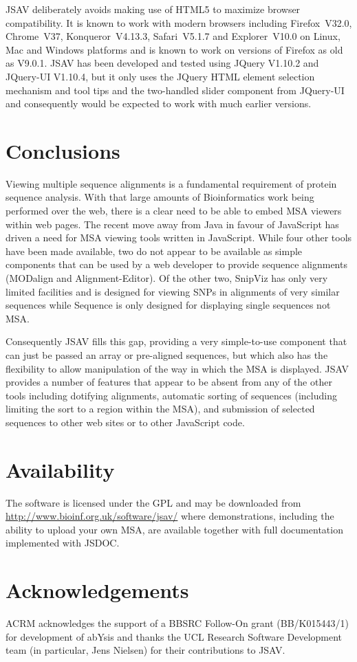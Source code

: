 \documentclass[12pt]{article}
\begin{document}
JSAV deliberately avoids making use of HTML5 to maximize browser
compatibility. It is known to work with modern browsers including
Firefox~V32.0, Chrome~V37, Konqueror~V4.13.3, Safari~V5.1.7 and
Explorer~V10.0 on Linux, Mac and Windows platforms and is known to
work on versions of Firefox as old as V9.0.1. JSAV has been developed
and tested using JQuery V1.10.2 and JQuery-UI V1.10.4, but it only
uses the JQuery HTML element selection mechanism and tool tips and the
two-handled slider component from JQuery-UI and consequently would be
expected to work with much earlier versions.

\section{Conclusions}
Viewing multiple sequence alignments is a fundamental requirement of
protein sequence analysis. With that large amounts of Bioinformatics
work being performed over the web, there is a clear need to be able to
embed MSA viewers within web pages. The recent move away from Java in
favour of JavaScript has driven a need for MSA viewing tools written
in JavaScript. While four other tools have been made available, two do
not appear to be available as simple components that can be used by a
web developer to provide sequence alignments (MODalign and
Alignment-Editor). Of the other two, SnipViz has only very limited
facilities and is designed for viewing SNPs in alignments of very
similar sequences while Sequence is only designed for displaying single
sequences not MSA.

Consequently JSAV fills this gap, providing a very simple-to-use
component that can just be passed an array or pre-aligned sequences,
but which also has the flexibility to allow manipulation of the way in
which the MSA is displayed. JSAV provides a number of features that
appear to be absent from any of the other tools including dotifying
alignments, automatic sorting of sequences (including limiting the
sort to a region within the MSA), and submission of selected sequences
to other web sites or to other JavaScript code.


\section{Availability}
The software is licensed under the GPL and may be downloaded from
\url{http://www.bioinf.org.uk/software/jsav/} where demonstrations,
including the ability to upload your own MSA, are available together
with full documentation implemented with JSDOC.

\section{Acknowledgements}
ACRM acknowledges the support of a BBSRC Follow-On grant
(BB/K015443/1) for development of abYsis and thanks the UCL Research
Software Development team (in particular, Jens Nielsen) for their
contributions to JSAV.


\end{document}
